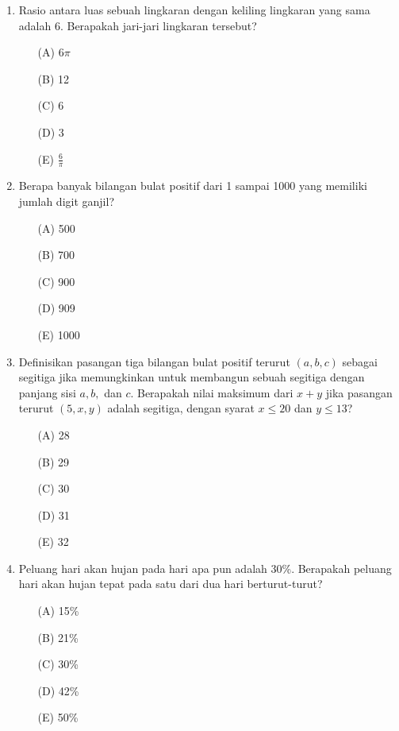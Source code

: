 \documentclass[12pt]{scrartcl}
\begin{document}
\begin{enumerate}
    \item Rasio antara luas sebuah lingkaran dengan keliling lingkaran yang sama adalah 6. Berapakah jari-jari lingkaran tersebut?
    \begin{itemize}
        \item[(A)] $6\pi$
        \item[(B)] 12
        \item[(C)] 6
        \item[(D)] 3
        \item[(E)] $\frac{6}{\pi}$
    \end{itemize}

    \item Berapa banyak bilangan bulat positif dari 1 sampai 1000 yang memiliki jumlah digit ganjil?
    \begin{itemize}
        \item[(A)] 500
        \item[(B)] 700
        \item[(C)] 900
        \item[(D)] 909
        \item[(E)] 1000
    \end{itemize}

    \item Definisikan pasangan tiga bilangan bulat positif terurut $(a, b, c)$ sebagai segitiga jika memungkinkan untuk membangun sebuah segitiga dengan panjang sisi $a, b,$ dan $c$. Berapakah nilai maksimum dari $x+y$ jika pasangan terurut $(5, x, y)$ adalah segitiga, dengan syarat $x \le 20$ dan $y \le 13$?
    \begin{itemize}
        \item[(A)] 28
        \item[(B)] 29
        \item[(C)] 30
        \item[(D)] 31
        \item[(E)] 32
    \end{itemize}

    \item Peluang hari akan hujan pada hari apa pun adalah 30\%. Berapakah peluang hari akan hujan tepat pada satu dari dua hari berturut-turut?
    \begin{itemize}
        \item[(A)] 15\%
        \item[(B)] 21\%
        \item[(C)] 30\%
        \item[(D)] 42\%
        \item[(E)] 50\%
    \end{itemize}


\end{enumerate}
\end{document}
